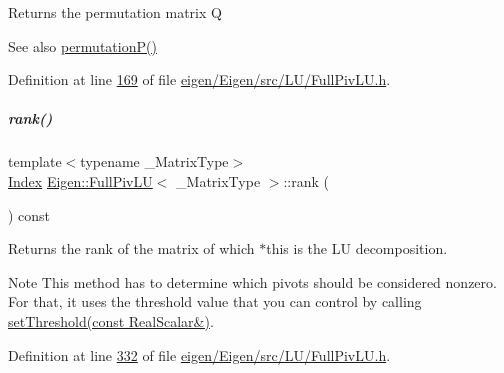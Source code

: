 \begin{DoxyReturn}{Returns}
the permutation matrix Q
\end{DoxyReturn}
\begin{DoxySeeAlso}{See also}
\hyperlink{group___l_u___module_a09274c82240f6441af5e6c99e24e756d}{permutation\+P()} 
\end{DoxySeeAlso}


Definition at line \hyperlink{eigen_2_eigen_2src_2_l_u_2_full_piv_l_u_8h_source_l00169}{169} of file \hyperlink{eigen_2_eigen_2src_2_l_u_2_full_piv_l_u_8h_source}{eigen/\+Eigen/src/\+L\+U/\+Full\+Piv\+L\+U.\+h}.

\mbox{\label{group___l_u___module_a67a870aa69e699e058d04802ba0bdad9}} 
\subparagraph{\texorpdfstring{rank()}{rank()}\hspace{0.1cm}{\footnotesize\ttfamily [1/2]}}
{\footnotesize\ttfamily template$<$typename \+\_\+\+Matrix\+Type$>$ \\
\hyperlink{group___core___module_a554f30542cc2316add4b1ea0a492ff02}{Index} \hyperlink{group___l_u___module_class_eigen_1_1_full_piv_l_u}{Eigen\+::\+Full\+Piv\+LU}$<$ \+\_\+\+Matrix\+Type $>$\+::rank (\begin{DoxyParamCaption}{ }\end{DoxyParamCaption}) const\hspace{0.3cm}{\ttfamily [inline]}}

\begin{DoxyReturn}{Returns}
the rank of the matrix of which $\ast$this is the LU decomposition.
\end{DoxyReturn}
\begin{DoxyNote}{Note}
This method has to determine which pivots should be considered nonzero. For that, it uses the threshold value that you can control by calling \hyperlink{group___l_u___module_a414592d82de98f5bd075965caf56d681}{set\+Threshold(const Real\+Scalar\&)}. 
\end{DoxyNote}


Definition at line \hyperlink{eigen_2_eigen_2src_2_l_u_2_full_piv_l_u_8h_source_l00332}{332} of file \hyperlink{eigen_2_eigen_2src_2_l_u_2_full_piv_l_u_8h_source}{eigen/\+Eigen/src/\+L\+U/\+Full\+Piv\+L\+U.\+h}.


